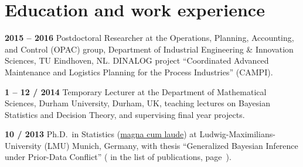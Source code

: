 \documentclass[a4paper]{simplecv}
\begin{document}
\newpage
\section{Education and work experience}
\label{education}


\begin{topic}
\item[\hspace*{-2ex}\bfseries 2015 -- 2016] Postdoctoral Researcher
                  at the Operations, Planning, Accounting, and Control (OPAC) group,
                  Department of Industrial Engineering \& Innovation Sciences,
                  TU Eindhoven, NL.
DINALOG project ``Coordinated Advanced Maintenance and Logistics Planning for the Process Industries'' (CAMPI).

\item[\hspace*{-2ex}\bfseries 1 -- 12 / 2014]Temporary Lecturer
                  at the Department of Mathematical Sciences,
                  Durham University, Durham, UK,
                  teaching lectures on Bayesian Statistics and Decision Theory,
                  and supervising final year projects. 


\item[\hspace*{-2ex}\bfseries 10 / 2013] Ph.D.\ in Statistics (\href{http://www.geeero.de/files/drrernat-en.pdf}{magna cum laude}) at
                  Lud\-wig-Maximi\-li\-ans-Uni\-ver\-si\-ty (LMU) Munich, Germany,
                  with thesis ``Generalized Bayesian Inference under Prior-Data Conflict''
                  (\cite{diss} in the list of publications, page~\pageref{publications}).



\end{topic}
\end{document}
